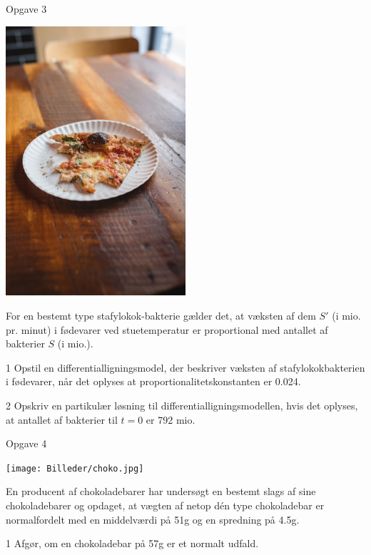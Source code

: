 \documentclass[12pt,x11names,a4paper]{article}
\begin{document}
\begin{opgavetekst}{Opgave 3}
	\begin{center}
		\includegraphics[width=0.5\textwidth]{Billeder/pizza.jpg}
	\end{center}
	For en bestemt type stafylokok-bakterie gælder det, at væksten af dem $S'$ (i mio. pr. minut) i fødevarer ved stuetemperatur er proportional med antallet af bakterier $S$ (i mio.). 
\end{opgavetekst}
\begin{delopgave}{}{1}
	Opstil en differentialligningsmodel, der beskriver væksten af stafylokokbakterien i fødevarer, når det oplyses at proportionalitetskonstanten er 0.024.
\end{delopgave}
\begin{delopgave}{}{2}
	Opskriv en partikulær løsning til differentialligningsmodellen, hvis det oplyses, at antallet af bakterier til $t=0$ er 792 mio. 
\end{delopgave}
\begin{opgavetekst}{Opgave 4 }
	\begin{center}
		\texttt{[image: Billeder/choko.jpg]}
	\end{center}
	En producent af chokoladebarer har undersøgt en bestemt slags af sine chokoladebarer og opdaget, at vægten af netop dén type chokoladebar er normalfordelt
	med en middelværdi på 51g og en spredning på 4.5g.
\end{opgavetekst}
\begin{delopgave}{}{1}
	Afgør, om en chokoladebar på 57g er et normalt udfald. 
\end{delopgave}
\end{document}

